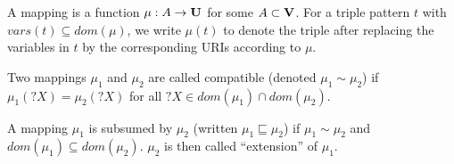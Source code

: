 \begin{definition}
	A mapping is a function $\mu: A \rightarrow  \mathbf{U}$ for some $A \subset \mathbf{V}$. 
	For a triple pattern $t$ with $vars(t) \subseteq dom(\mu)$, we write $\mu(t)$ to 
	denote the triple after replacing the variables in $t$ by the corresponding 
	URIs according to $\mu$. 

	\noindent Two mappings $\mu_1$ and $\mu_2$ are called compatible (denoted $\mu_1 \sim \mu_2$) 
	if $\mu_1(?X) = \mu_2(?X)$ for all $?X \in dom(\mu_1) \cap dom(\mu_2)$.

	\noindent A mapping $\mu_1$ is subsumed by $\mu_2$ (written $\mu_1 \sqsubseteq \mu_2$) 
	if $\mu_1 \sim \mu_2$ and $dom(\mu_1) \subseteq dom(\mu_2)$. $\mu_2$ is then called ``extension'' of $\mu_1$.


\end{definition}
